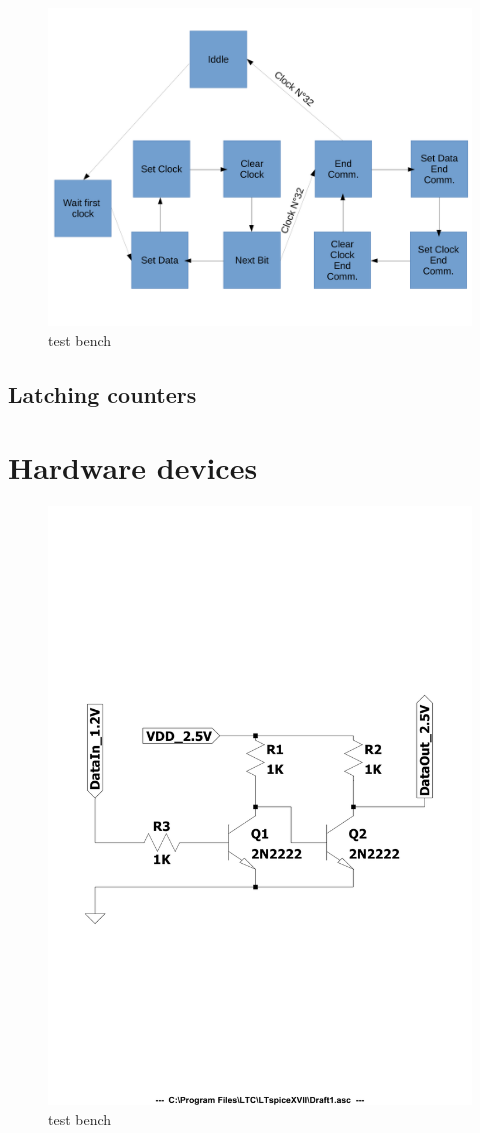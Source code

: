 \begin{figure}[H]
	\centering
	\includegraphics[width=0.7\linewidth]{IMG/ch4/FSM}
	\caption{test bench}
	\label{fig:fsm}
\end{figure}

\subsection{Latching counters}

\section{Hardware devices}

\begin{figure}[H]
	\centering
	\includegraphics[width=0.7\linewidth]{IMG/ch4/DIAGRAM}
	\caption{test bench}
	\label{fig:diagram}
\end{figure}

